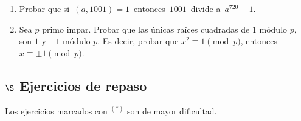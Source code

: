 \documentclass[a4paper,12pt,twoside,spanish,reqno]{amsbook}
\numberwithin{equation}{section}
\begin{document}
\begin{enumerate}
%

%
\item Probar que si \,$(a,1001)=1$\, entonces \,$1001$\, divide a \,$a^{720}-1$.

\item\label{ej-raiz-de-1-mod-p} Sea $p$ primo impar.  Probar que las únicas raíces cuadradas de 1 módulo $p$,  son $1$ y $-1$ módulo $p$. Es decir, probar que $x^2 \equiv 1 \pmod{p}$, entonces  $x \equiv \pm1 \pmod{p}$.

\end{enumerate}



\subsection*{$\S$ Ejercicios de repaso} Los ejercicios marcados con ${}^{(*)}$ son de mayor dificultad.
\end{document}
